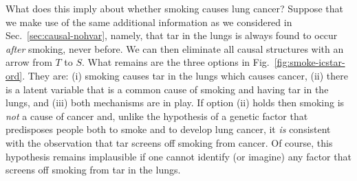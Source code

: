 \documentclass[12pt,onecolumn,nofootinbib]{revtex4-2}
\begin{document}
What does this imply about whether smoking causes lung cancer?  Suppose that we make use of the same additional information as we considered in Sec.~\ref{sec:causal-nohvar}, namely, that tar in the lungs is always found to occur \emph{after} smoking, never before.  We can then eliminate all causal structures with an arrow from $T$ to $S$.  What remains are the three options in Fig.~\ref{fig:smoke-icstar-ord}.  They are: (i) smoking causes tar in the lungs which causes cancer, (ii) there is a latent variable that is a common cause of smoking and having tar in the lungs, and (iii) both mechanisms are in play.  If option (ii) holds then smoking is \emph{not} a cause of cancer and, unlike the hypothesis of a genetic factor that predisposes people both to smoke and to develop lung cancer, it \emph{is} consistent with the observation that tar screens off smoking from cancer.  Of course, this hypothesis remains implausible if one cannot identify (or imagine) any factor that screens off smoking from tar in the lungs.
\end{document}
